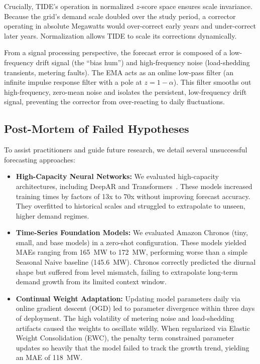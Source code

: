 \documentclass[10pt,twocolumn,letterpaper]{article}
\begin{document}
Crucially, TIDE's operation in normalized $z$-score space ensures scale invariance. Because the grid's demand scale doubled over the study period, a corrector operating in absolute Megawatts would over-correct early years and under-correct later years. Normalization allows TIDE to scale its corrections dynamically.

From a signal processing perspective, the forecast error is composed of a low-frequency drift signal (the ``bias hum'') and high-frequency noise (load-shedding transients, metering faults). The EMA acts as an online low-pass filter (an infinite impulse response filter with a pole at $z = 1 - \alpha$). This filter smooths out high-frequency, zero-mean noise and isolates the persistent, low-frequency drift signal, preventing the corrector from over-reacting to daily fluctuations.

\subsection{Post-Mortem of Failed Hypotheses}
To assist practitioners and guide future research, we detail several unsuccessful forecasting approaches:
\begin{itemize}
    \item \textbf{High-Capacity Neural Networks:} We evaluated high-capacity architectures, including DeepAR and Transformers~\cite{zhou2021informer}. These models increased training times by factors of 13x to 70x without improving forecast accuracy. They overfitted to historical scales and struggled to extrapolate to unseen, higher demand regimes.
    \item \textbf{Time-Series Foundation Models:} We evaluated Amazon Chronos (tiny, small, and base models) in a zero-shot configuration. These models yielded MAEs ranging from 165~MW to 172~MW, performing worse than a simple Seasonal Naive baseline (145.6~MW). Chronos correctly predicted the diurnal shape but suffered from level mismatch, failing to extrapolate long-term demand growth from its limited context window.
    \item \textbf{Continual Weight Adaptation:} Updating model parameters daily via online gradient descent (OGD) led to parameter divergence within three days of deployment. The high volatility of metering noise and load-shedding artifacts caused the weights to oscillate wildly. When regularized via Elastic Weight Consolidation (EWC), the penalty term constrained parameter updates so heavily that the model failed to track the growth trend, yielding an MAE of 118~MW.
\end{itemize}
\end{document}
